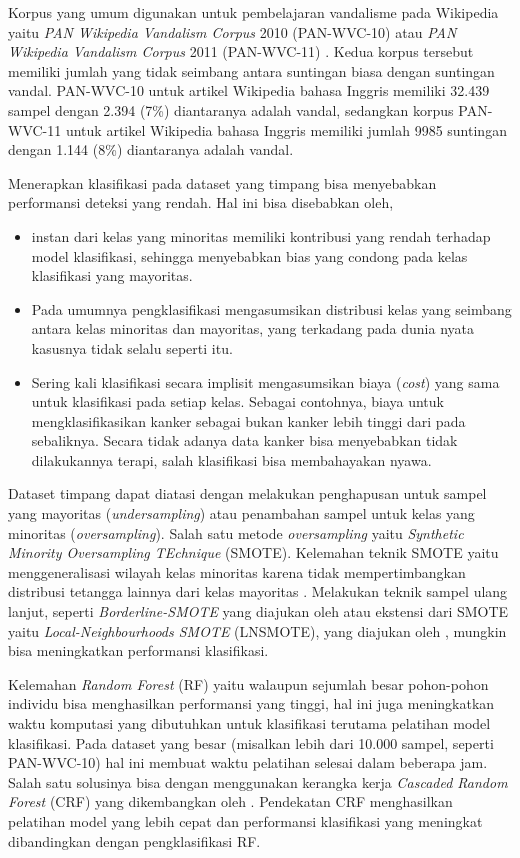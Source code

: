 Korpus yang umum digunakan untuk pembelajaran vandalisme pada Wikipedia yaitu
\textit{PAN Wikipedia Vandalism Corpus} 2010 (PAN-WVC-10)
atau
\textit{PAN Wikipedia Vandalism Corpus} 2011 (PAN-WVC-11)
\parencite{potthast:2010b}.
Kedua korpus tersebut memiliki jumlah yang tidak seimbang antara suntingan
biasa dengan suntingan vandal.
PAN-WVC-10 untuk artikel Wikipedia bahasa Inggris memiliki 32.439 sampel dengan
2.394 (7\%) diantaranya adalah vandal, sedangkan korpus PAN-WVC-11 untuk
artikel Wikipedia bahasa Inggris memiliki jumlah 9985 suntingan dengan 1.144
(8\%) diantaranya adalah vandal.

Menerapkan klasifikasi pada dataset yang timpang bisa menyebabkan performansi
deteksi yang rendah.
Hal ini bisa disebabkan oleh,
\begin{itemize}
	\item instan dari kelas yang minoritas memiliki kontribusi yang rendah
	terhadap model klasifikasi, sehingga menyebabkan bias yang condong pada
	kelas klasifikasi yang mayoritas.
	\item Pada umumnya pengklasifikasi mengasumsikan distribusi kelas yang
	seimbang antara kelas minoritas dan mayoritas, yang terkadang pada
	dunia nyata kasusnya tidak selalu seperti itu.
	\item Sering kali klasifikasi secara implisit mengasumsikan biaya
	(\textit{cost}) yang sama untuk klasifikasi pada setiap kelas.
	Sebagai contohnya, biaya untuk mengklasifikasikan kanker sebagai bukan
	kanker lebih tinggi dari pada sebaliknya.
	Secara tidak adanya data kanker bisa menyebabkan tidak dilakukannya
	terapi, salah klasifikasi bisa membahayakan nyawa.
\end{itemize}

Dataset timpang dapat diatasi dengan melakukan penghapusan untuk sampel yang
mayoritas (\textit{undersampling}) atau penambahan sampel untuk kelas
yang minoritas (\textit{oversampling}).
Salah satu metode \textit{oversampling} yaitu \textit{Synthetic Minority
Oversampling TEchnique} (SMOTE).
Kelemahan teknik SMOTE yaitu menggeneralisasi wilayah kelas
minoritas karena tidak mempertimbangkan distribusi tetangga lainnya dari
kelas mayoritas
\parencite{maciejewski2011local}.
Melakukan teknik sampel ulang lanjut, seperti
\textit{Borderline-SMOTE}
yang diajukan oleh
\textcite{han2005borderline}
atau ekstensi dari SMOTE yaitu \textit{Local-Neighbourhoods SMOTE} (LNSMOTE), yang
diajukan oleh
\textcite{maciejewski2011local},
mungkin bisa meningkatkan performansi klasifikasi.

Kelemahan \textit{Random Forest} (RF) yaitu walaupun sejumlah besar pohon-pohon
individu bisa menghasilkan performansi yang tinggi, hal ini juga meningkatkan
waktu komputasi yang dibutuhkan untuk klasifikasi terutama pelatihan
model klasifikasi.
Pada dataset yang besar (misalkan lebih dari 10.000 sampel, seperti
PAN-WVC-10) hal ini membuat waktu pelatihan selesai dalam beberapa jam.
Salah satu solusinya bisa dengan menggunakan kerangka kerja
\textit{Cascaded Random Forest} (CRF)
yang dikembangkan oleh
\textcite{baumann2013cascaded}.
Pendekatan CRF menghasilkan pelatihan model yang lebih cepat dan performansi
klasifikasi yang meningkat dibandingkan dengan pengklasifikasi RF.

